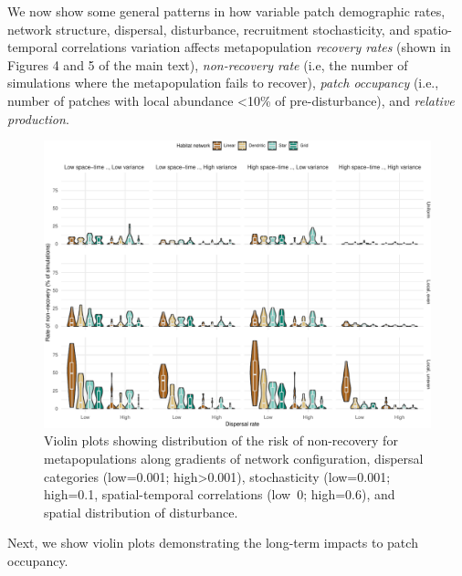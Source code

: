 \documentclass[
]{article}
\begin{document}
We now show some general patterns in how variable patch demographic
rates, network structure, dispersal, disturbance, recruitment
stochasticity, and spatio-temporal correlations variation affects
metapopulation \emph{recovery rates} (shown in Figures 4 and 5 of the
main text), \emph{non-recovery rate} (i.e, the number of simulations
where the metapopulation fails to recover), \emph{patch occupancy}
(i.e., number of patches with local abundance \textless10\% of
pre-disturbance), and \emph{relative production}.

\begin{figure}[H]

{\centering \includegraphics{Managing_for_ecological_surprises_in_metapopulations_files/figure-latex/violin plots of risk of non-recovery-1} 

}

\caption{Violin plots showing distribution of the risk of non-recovery for metapopulations along gradients of network configuration, dispersal categories (low=0.001; high>0.001), stochasticity (low=0.001; high=0.1, spatial-temporal correlations (low~0; high=0.6), and spatial distribution of disturbance.}\label{fig:violin plots of risk of non-recovery}
\end{figure}

Next, we show violin plots demonstrating the long-term impacts to patch
occupancy.
\end{document}
